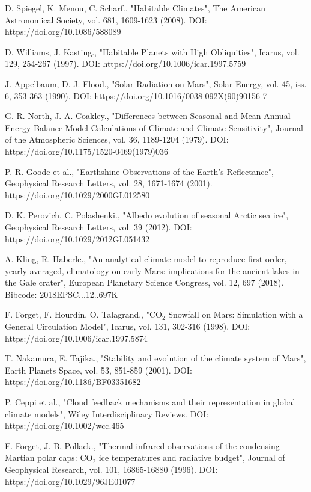 \documentclass[12pt,onecolumn]{revtex4-2}    %
\begin{document}
%
\begin{thebibliography}{}

 D. Spiegel, K. Menou, C. Scharf., "Habitable Climates", The American Astronomical Society, vol. 681, 1609-1623 (2008). DOI: 
https://doi.org/10.1086/588089

 D. Williams, J. Kasting., "Habitable Planets with High Obliquities", Icarus, vol. 129, 254-267 (1997). DOI: https://doi.org/10.1006/icar.1997.5759

 J. Appelbaum, D. J. Flood., "Solar Radiation on Mars", Solar Energy, vol. 45, iss. 6, 353-363 (1990). DOI: https://doi.org/10.1016/0038-092X(90)90156-7

 G. R. North, J. A. Coakley., "Differences between Seasonal and Mean Annual Energy Balance Model Calculations of Climate and Climate Sensitivity", Journal of the Atmospheric Sciences, vol. 36, 1189-1204 (1979). DOI: https://doi.org/10.1175/1520-0469(1979)036%

 P. R. Goode et al., "Earthshine Observations of the Earth's Reflectance", Geophysical Research Letters, vol. 28, 1671-1674 (2001). https://doi.org/10.1029/2000GL012580

 D. K. Perovich, C. Polashenki., "Albedo evolution of seasonal Arctic sea ice", Geophysical Research Letters, vol. 39 (2012). DOI: https://doi.org/10.1029/2012GL051432

 A. Kling, R. Haberle., "An analytical climate model to reproduce first order, yearly-averaged, climatology on early Mars: implications for the ancient lakes in the Gale crater", European Planetary Science Congress, vol. 12, 697 (2018). Bibcode: 2018EPSC...12..697K

 F. Forget, F. Hourdin, O. Talagrand., "$\mathrm{CO_2}$ Snowfall on Mars: Simulation with a General Circulation Model", Icarus, vol. 131, 302-316 (1998). DOI: https://doi.org/10.1006/icar.1997.5874

 T. Nakamura, E. Tajika., "Stability and evolution of the climate system of Mars", Earth Planets Space, vol. 53, 851-859 (2001). DOI: 
https://doi.org/10.1186/BF03351682

 P. Ceppi et al., "Cloud feedback mechanisms and their representation in global climate models", Wiley Interdisciplinary Reviews. DOI: https://doi.org/10.1002/wcc.465

 F. Forget, J. B. Pollack., "Thermal infrared observations of the condensing Martian polar caps: $\mathrm{CO_2}$ ice temperatures and radiative budget", Journal of Geophysical Research, vol. 101, 16865-16880 (1996). DOI: https://doi.org/10.1029/96JE01077


\end{thebibliography}
\end{document}
